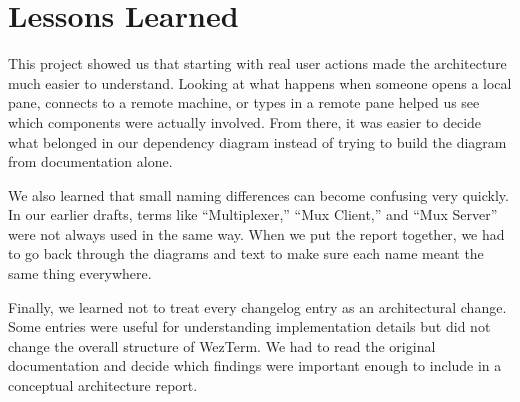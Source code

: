 \section{Lessons Learned}
\label{sec:lessons-learned}

This project showed us that starting with real user actions made the architecture much easier to understand. Looking at what happens when someone opens a local pane, connects to a remote machine, or types in a remote pane helped us see which components were actually involved. From there, it was easier to decide what belonged in our dependency diagram instead of trying to build the diagram from documentation alone.

We also learned that small naming differences can become confusing very quickly. In our earlier drafts, terms like “Multiplexer,” “Mux Client,” and “Mux Server” were not always used in the same way. When we put the report together, we had to go back through the diagrams and text to make sure each name meant the same thing everywhere.

Finally, we learned not to treat every changelog entry as an architectural change. Some entries were useful for understanding implementation details but did not change the overall structure of WezTerm. We had to read the original documentation and decide which findings were important enough to include in a conceptual architecture report.
